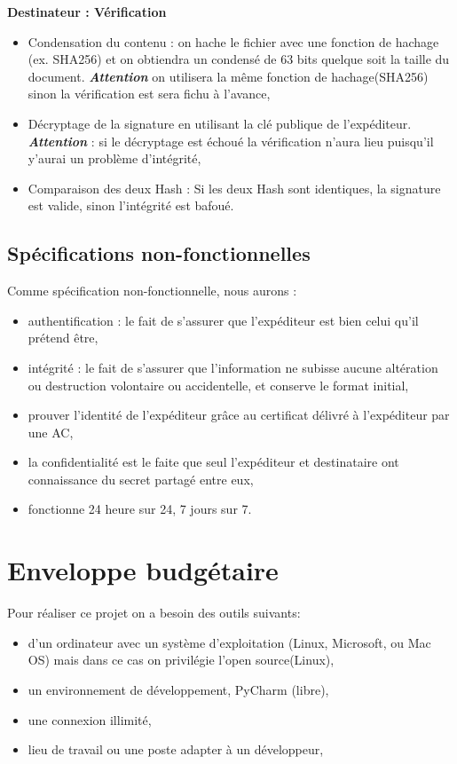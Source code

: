 \documentclass[12pt,a4paper]{article}
\begin{document}
\begin{enumerate}
			\textbf{Destinateur : Vérification}\\
			\begin{itemize}
				\item Condensation du contenu : on hache le fichier avec une fonction de hachage (ex. SHA256) et on obtiendra un condensé de 63 bits quelque soit la taille du document. \emph{\textbf{Attention}} on utilisera la même fonction de hachage(SHA256) sinon la vérification est sera fichu à l'avance,
				\item Décryptage de la signature en utilisant la clé publique de l'expéditeur. \emph{\textbf{Attention}} : si le décryptage est échoué la vérification n'aura lieu puisqu'il y'aurai un problème d'intégrité,
				\item Comparaison des deux Hash : Si les deux Hash sont identiques, la signature est valide, sinon l'intégrité est bafoué.\\
				
			\end{itemize}
		\end{enumerate}
		
	\subsection{Spécifications non-fonctionnelles}
	Comme spécification non-fonctionnelle, nous aurons :
	\begin{itemize}
		\item authentification : le fait de s'assurer que l'expéditeur est bien celui qu'il prétend être,
		\item intégrité : le fait de s'assurer que l'information ne subisse aucune altération ou destruction volontaire ou accidentelle, et conserve le format initial,
		\item prouver l'identité de l'expéditeur grâce au certificat délivré à l'expéditeur par une AC,
		\item la confidentialité est le faite que seul l'expéditeur et destinataire ont connaissance du secret partagé entre eux,
		\item fonctionne 24 heure sur 24, 7 jours sur 7.
	\end{itemize}

\section{Enveloppe budgétaire}
Pour réaliser ce projet on a besoin des outils suivants:
	\begin{itemize}
		\item d'un ordinateur avec un système d'exploitation (Linux, Microsoft, ou Mac OS) mais dans ce cas on privilégie l'open source(Linux),
		\item un environnement de développement, PyCharm (libre),
		\item une connexion illimité,
		\item lieu de travail ou une poste adapter à un développeur,
		
	\end{itemize}	 
\end{document}
